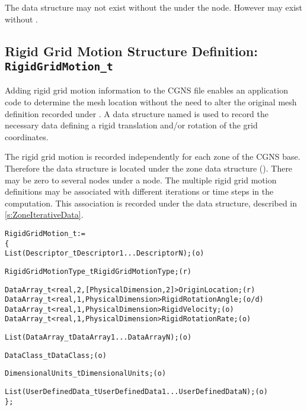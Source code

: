 The  data structure may not exist without
the  under the  node.
However  may exist without
.

\subsection{Rigid Grid Motion Structure Definition: \texttt{RigidGridMotion\_t}}
\label{s:RigidGridMotion}

Adding rigid grid motion information to the CGNS file enables an
application code to determine the mesh location without the need to
alter the original mesh definition recorded under .
A data structure named  is used to record the
necessary data defining a rigid translation and/or rotation of the grid
coordinates.

The rigid grid motion is recorded independently for each zone of the
CGNS base.
Therefore the  data structure is located under
the zone data structure ().
There may be zero to several  nodes under a
 node.
The multiple rigid grid motion definitions may be associated with
different iterations or time steps in the computation.
This association is recorded under the  data
structure, described in \autoref{s:ZoneIterativeData}.

\begin{alltt}
  RigidGridMotion\_t :=
    \{
    List( Descriptor\_t Descriptor1 ... DescriptorN ) ;                      (o)

    RigidGridMotionType\_t RigidGridMotionType ;                             (r)

    DataArray\_t<real, 2, [PhysicalDimension, 2]> OriginLocation ;           (r)
    DataArray\_t<real, 1,  PhysicalDimension>     RigidRotationAngle ;       (o/d)
    DataArray\_t<real, 1,  PhysicalDimension>     RigidVelocity ;            (o)
    DataArray\_t<real, 1,  PhysicalDimension>     RigidRotationRate ;        (o)

    List( DataArray\_t DataArray1 ... DataArrayN ) ;                         (o)

    DataClass\_t DataClass ;                                                 (o)

    DimensionalUnits\_t DimensionalUnits ;                                   (o)

    List( UserDefinedData\_t UserDefinedData1 ... UserDefinedDataN ) ;       (o)
    \} ;
\end{alltt}


